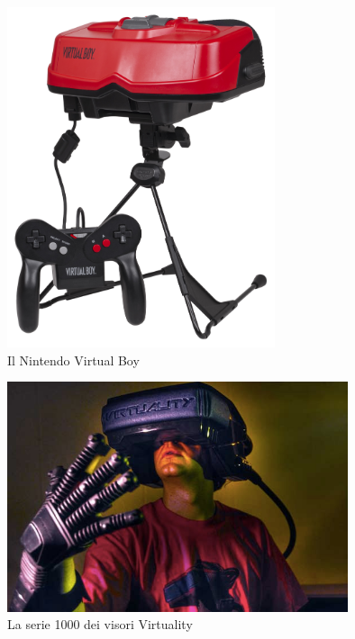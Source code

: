         \begin{figure}[!ht]
            \centering
            \includegraphics[height=10cm]{figure/Virtual-Boy-Set.jpg}
            \caption{Il Nintendo Virtual Boy}
        \end{figure}

        \begin{figure}[!ht]
            \centering
            \includegraphics[width=10cm]{figure/virtuality-dataglove.jpg}
            \caption{La serie 1000 dei visori Virtuality}
        \end{figure}

